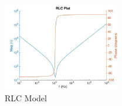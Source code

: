 \begin{figure}
\includegraphics[keepaspectratio=true,width=2in]{./figures/modeling/rlcModel.jpg}
\centering
\caption{RLC Model}
\label{fig:rlcModel}
\end{figure}
